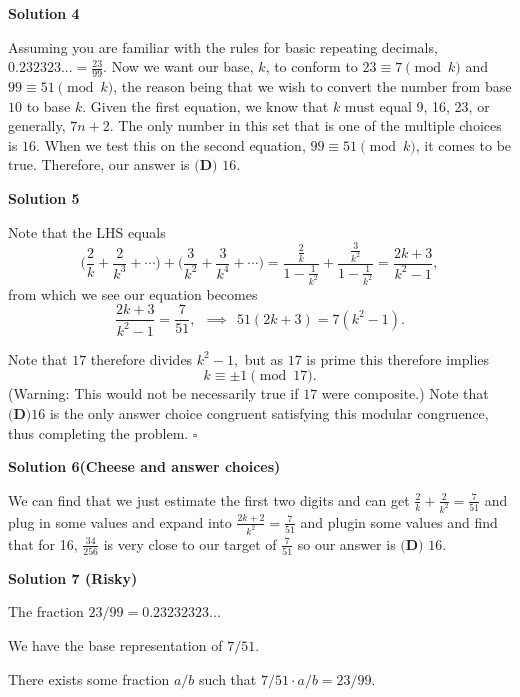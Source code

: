 \begin{enumerate}
 



\textbf{Solution 4}

Assuming you are familiar with the rules for basic repeating decimals, $0.232323... = \frac{23}{99}$. Now we want our base, $k$, to conform to $23\equiv7\pmod k$ and $99\equiv51\pmod k$, the reason being that we wish to convert the number from base $10$ to base $k$. Given the first equation, we know that $k$ must equal 9, 16, 23, or generally, $7n+2$. The only number in this set that is one of the multiple choices is $16$. When we test this on the second equation, $99\equiv51\pmod k$, it comes to be true. Therefore, our answer is $\boxed{\textbf{(D) }16}$.

 



\textbf{Solution 5}

Note that the LHS equals 
 \[\bigg(\frac{2}{k} + \frac{2}{k^3} + \cdots \bigg) + \bigg(\frac{3}{k^2} + \frac{3}{k^4} + \cdots \bigg) = \frac{\frac{2}{k}}{1 - \frac{1}{k^2}} + \frac{\frac{3}{k^2}}{1 - \frac{1}{k^2}} = \frac{2k+3}{k^2-1},\] from which we see our equation becomes 
 \[\frac{2k+3}{k^2-1} = \frac{7}{51}, \ \ \implies \ \ 51(2k+3) = 7(k^2-1).\] 

 Note that $17$ therefore divides $k^2 - 1,$ but as $17$ is prime this therefore implies 
 \[k \equiv \pm 1 \pmod{17}.\] (Warning: This would not be necessarily true if $17$ were composite.) Note that $\boxed{\textbf{(D)} 16 }$ is the only answer choice congruent satisfying this modular congruence, thus completing the problem. $\square$




\textbf{Solution 6(Cheese and answer choices)}

We can find that we just estimate the first two digits and can get $\frac{2}{k} + \frac{2}{k^2} = \frac{7}{51}$ and plug in some values and expand into $\frac{2k+2}{k^2} = \frac{7}{51}$ and plugin some values and find that for 16, $\frac{34}{256}$ is very close to our target of $\frac{7}{51}$ so our answer is $\boxed{\textbf{(D) }16}$.

 



\textbf{Solution 7 (Risky)}

The fraction \( 23/99 = 0.23232323... \)

 We have the base representation of \( 7/51 \).

 There exists some fraction \( a/b \) such that \( 7/51 \cdot a/b = 23/99 \).


\end{enumerate}
